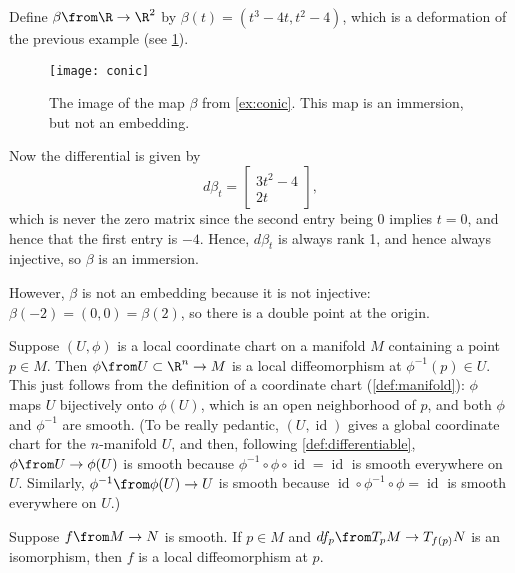 \begin{example}\label{ex:conic}
	Define $\beta \from \R \to \R^2$ by $\beta(t) = (t^3 - 4t, t^2 - 4)$, which is a deformation of the previous example (see \cref{fig:conic}).
	
	\begin{figure}[htbp]
		\centering
			\texttt{[image: conic]}
		\caption{The image of the map $\beta$ from \cref{ex:conic}. This map is an immersion, but not an embedding.}
		\label{fig:conic}
	\end{figure}
	
	Now the differential is given by
	\[
		d\beta_t = \begin{bmatrix} 3t^2 - 4 \\ 2t \end{bmatrix},
	\]
	which is never the zero matrix since the second entry being 0 implies $t=0$, and hence that the first entry is $-4$. Hence, $d\beta_t$ is always rank 1, and hence always injective, so $\beta$ is an immersion.
	
	However, $\beta$ is not an embedding because it is not injective: $\beta(-2) = (0,0) = \beta(2)$, so there is a double point at the origin.
\end{example}

\begin{example}\label{ex:coordinate charts are local diffeomorphisms}
	Suppose $(U,\phi)$ is a local coordinate chart on a manifold $M$ containing a point $p \in M$. Then $\phi \from U \subset \R^n \to M$ is a local diffeomorphism at $\phi^{-1}(p) \in U$. This just follows from the definition of a coordinate chart (\cref{def:manifold}): $\phi$ maps $U$ bijectively onto $\phi(U)$, which is an open neighborhood of $p$, and both $\phi$ and $\phi^{-1}$ are smooth. (To be really pedantic, $(U, \operatorname{id})$ gives a global coordinate chart for the $n$-manifold $U$, and then, following \cref{def:differentiable}, $\phi \from U \to \phi(U)$ is smooth because $\phi^{-1} \circ \phi \circ \operatorname{id} = \operatorname{id}$ is smooth everywhere on $U$. Similarly, $\phi^{-1} \from \phi(U) \to U$ is smooth because $\operatorname{id} \circ \phi^{-1} \circ \phi = \operatorname{id}$ is smooth everywhere on $U$.)
\end{example}

\begin{proposition}\label{prop:local diffeomorphism}
	Suppose $f \from M \to N$ is smooth. If $p \in M$ and $df_p \from T_p M \to T_{f(p)}N$ is an isomorphism, then $f$ is a local diffeomorphism at $p$.
\end{proposition}

